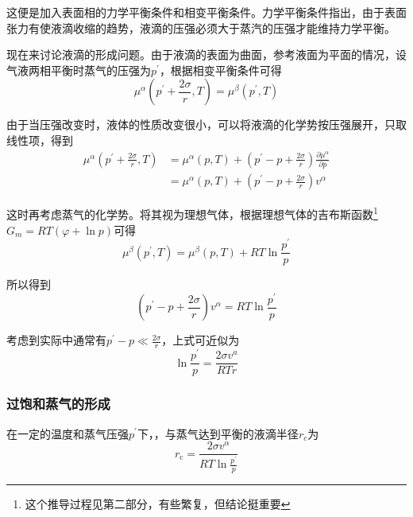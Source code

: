 \documentclass[UTF8]{ctexart}
\begin{document}
\noindent 这便是加入表面相的力学平衡条件和相变平衡条件。力学平衡条件指出，由于表面张力有使液滴收缩的趋势，液滴的压强必须大于蒸汽的压强才能维持力学平衡。

	现在来讨论液滴的形成问题。由于液滴的表面为曲面，参考液面为平面的情况，设气液两相平衡时蒸气的压强为$ p^{\prime} $，根据相变平衡条件可得
	\begin{equation}
	\mu^{\alpha}\left(p^{\prime}+\frac{2 \sigma}{r}, T\right)=\mu^{\beta}\left(p^{\prime}, T\right)
	\end{equation}
	
	由于当压强改变时，液体的性质改变很小，可以将液滴的化学势按压强展开，只取线性项，得到
	\begin{equation}
	\begin{aligned} \mu^{\alpha}\left(p^{\prime}+\frac{2 \sigma}{r}, T\right) &=\mu^{\alpha}(p, T)+\left(p^{\prime}-p+\frac{2 \sigma}{r}\right) \frac{\partial \mu^{\alpha}}{\partial p} \\ &=\mu^{\alpha}(p, T)+\left(p^{\prime}-p+\frac{2 \sigma}{r}\right) v^{\alpha} \end{aligned}
	\end{equation}
	
\noindent 这时再考虑蒸气的化学势。将其视为理想气体，根据理想气体的吉布斯函数\footnote{这个推导过程见第二部分，有些繁复，但结论挺重要}$ G_{m} = RT (\varphi + \ln p) $可得
\begin{equation}
\mu^{\beta}\left(p^{\prime}, T\right)=\mu^{\beta}(p, T)+R T \ln \frac{p^{\prime}}{p}
\end{equation}

\noindent 所以得到
\begin{equation}
\left(p^{\prime}-p+\frac{2 \sigma}{r}\right) v^{\alpha}=R T \ln \frac{p^{\prime}}{p}
\end{equation}

	考虑到实际中通常有$ p^{\prime} - p \ll \frac{2 \sigma}{r} $，上式可近似为
	\begin{equation}
	\ln \frac{p^{\prime}}{p}=\frac{2 \sigma v^{a}}{R T r}
	\end{equation}
	
	\subsubsection{过饱和蒸气的形成}
	在一定的温度和蒸气压强$ p^{\prime} $下，，与蒸气达到平衡的液滴半径$ r_{c} $为
	\begin{equation}
	r_{\mathrm{c}}=\frac{2 \sigma v^{\alpha}}{R T \ln \frac{p^{\prime}}{p}}
	\end{equation}
	
\end{document}
